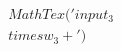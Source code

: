 \documentclass[preview]{standalone}
\begin{document}
\begin{align*}
MathTex('input _ 3  \\times  w _ 3  +')
\end{align*}
\end{document}
